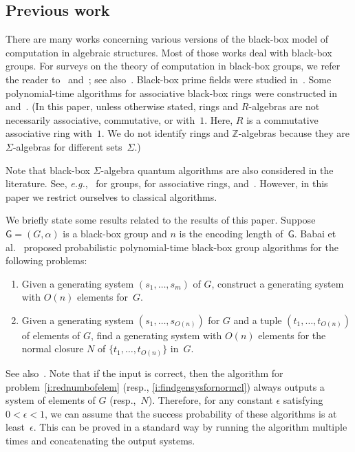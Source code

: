 \documentclass{jgcc}
\newcommand{\bb}{\mathsf}
\newcommand{\Z}{\mathbb Z}
\newcommand{\eg}{\emph{e.g.}}
\begin{document}
\subsection{Previous work}
\label{ss:prevwork}

There are many works concerning various versions of the
black-box model of computation in algebraic structures. Most
of those works deal with black-box groups. For surveys on
the theory of computation in black-box groups, we refer the
reader to~\cite{BB99} and~\cite[Subsections~2.2--2.4]{CF93};
see also~\cite[Chapter~2]{Ser03}. Black-box prime fields
were studied in~\cite{BL96}. Some polynomial-time algorithms
for associative black-box rings were constructed
in~\cite{ADM06} and~\cite{BP24}. (In this paper, unless
otherwise stated, rings and $R$-algebras are not necessarily
associative, commutative, or with~$1$. Here, $R$ is a
commutative associative ring with~$1$. We do not identify
rings and $\Z$-algebras because they are $\Sigma$-algebras
for different sets~$\Sigma$.)

Note that black-box $\Sigma$-algebra quantum algorithms are
also considered in the literature. See, \eg,~\cite{Wat01,
IMS03} for groups, \cite{ADM06, BP24} for associative rings,
and~\cite{Ano24}. However, in this paper we restrict
ourselves to classical algorithms.

We briefly state some results related to the results of this
paper. Suppose $\bb G=(G,\alpha)$ is a black-box group and
$n$ is the encoding length of~$\bb G$. Babai et
al.~\cite[Theorems~1.5, 2.5, and~3.7]{BCFLS95} proposed
probabilistic polynomial-time black-box group algorithms for
the following problems:
\begin{enumerate}[label=(\roman*)]
\item\label{i:rednumbofelem} Given a generating system
$(s_1,\dots,s_m)$ of $G$, construct a generating system with
$O(n)$ elements for~$G$.

\item\label{i:findgensysfornormcl} Given a generating system
$(s_1,\dots,s_{O(n)})$ for $G$ and a tuple
$(t_1,\dots,t_{O(n)})$ of elements of $G$, find a generating
system with $O(n)$ elements for the normal closure $N$ of
$\{t_1,\dots,t_{O(n)}\}$ in~$G$.
\end{enumerate}
See also~\cite[Subsections~2.3.2, 2.3.3, and~2.4.2]{Ser03}.
Note that if the input is correct, then the algorithm for
problem~\ref{i:rednumbofelem} (resp.,
\ref{i:findgensysfornormcl}) always outputs a system of
elements of $G$ (resp.,~$N$). Therefore, for any constant
$\epsilon$ satisfying $0<\epsilon<1$, we can assume that the
success probability of these algorithms is at
least~$\epsilon$. This can be proved in a standard way by
running the algorithm multiple times and concatenating the
output systems.
\end{document}
